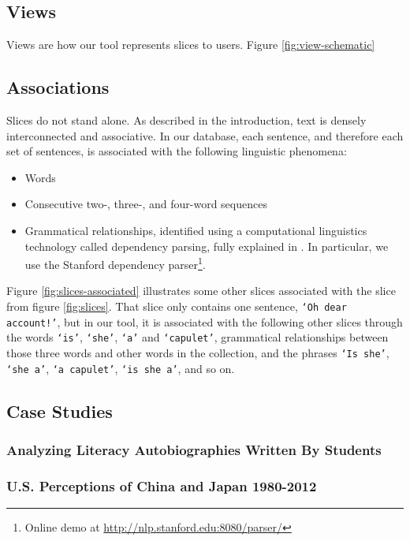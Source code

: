 \documentclass{sig-alternate}
\newcommand{\code}[1] {\texttt{#1}}
\begin{document}
\subsection{Views}
Views are how our tool represents slices to users. Figure \ref{fig:view-schematic} 

\subsection{Associations}
Slices do not stand alone. As described in the introduction, text is densely interconnected and associative. In our database, each sentence, and therefore each set of sentences, is associated with the following linguistic phenomena:
\begin{itemize}
  \item Words
  \item Consecutive two-, three-, and four-word sequences
  \item Grammatical relationships, identified using a computational linguistics technology called dependency parsing, fully explained in \cite{}. In particular, we use the Stanford dependency parser\footnote{Online demo  at \url{http://nlp.stanford.edu:8080/parser/}}\cite{}.
\end{itemize}
Figure \ref{fig:slices-associated} illustrates some other slices associated with the slice from figure \ref{fig:slices}. That slice only contains one sentence, \code{`Oh dear account!'}, but in our tool, it is associated with the following other slices through the words \code{`is'}, \code{`she'}, \code{`a'} and \code{`capulet'}, grammatical relationships between those three words and other words in the collection, and the phrases \code{`Is she'}, \code{`she a'}, \code{`a capulet'},  \code{`is she a'}, and so on.


\subsection{Case Studies}

\subsubsection{Analyzing Literacy Autobiographies Written By Students}

\subsubsection{U.S. Perceptions of China and Japan 1980-2012}
\end{document}
